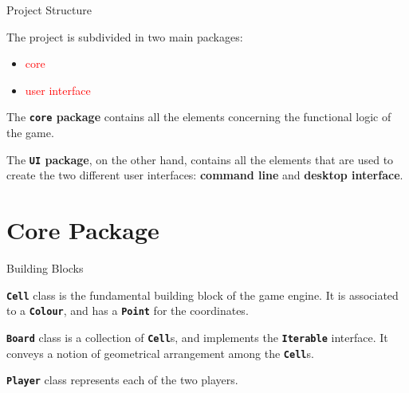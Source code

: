 \documentclass{beamer}
\begin{document}
  \begin{frame}{Project Structure}

    The project is subdivided in two main packages:

    \begin{itemize}
      \item \textcolor{red}{core}
      \item \textcolor{red}{user interface}
    \end{itemize}

    \pause

    \vspace{1em}

    The \textbf{\texttt{core} package} contains all the elements concerning the functional logic of the game.

    \pause

    \vspace{1em}

    The \textbf{\texttt{UI} package}, on the other hand, contains all the elements that are used to create the two different user interfaces: \textbf{command line} and \textbf{desktop interface}.

  \end{frame}



\section{Core Package}

  \begin{frame}{Building Blocks}

    \texttt{\textbf{Cell}} class is the fundamental building block of the game engine. It is associated to a \textbf{\texttt{Colour}}, and has a \textbf{\texttt{Point}} for the coordinates.

    \vspace{1em}

    \textbf{\texttt{Board}} class is a collection of \textbf{\texttt{Cell}}s, and implements the \textbf{\texttt{Iterable}} interface. It conveys a notion of geometrical arrangement among the \textbf{\texttt{Cell}}s.

    \vspace{1em}

    \textbf{\texttt{Player}} class represents each of the two players.

  \end{frame}
\end{document}
